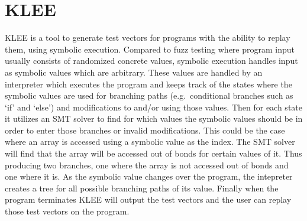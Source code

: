 \section{KLEE}
KLEE\cite{kleepaper} is a tool to generate test vectors for programs with the
ability to replay them, using symbolic execution. Compared to fuzz testing
where program input usually consists of randomized concrete values, symbolic
execution handles input as symbolic values which are arbitrary. These values
are handled by an interpreter which executes the program and keeps track of the
states where the symbolic values are used for branching paths (e.g.\
conditional branches such as `if' and `else') and modifications to and/or using
those values. Then for each state it utilizes an SMT solver to find for which
values the symbolic values should be in order to enter those branches or
invalid modifications. This could be the case where an array is accessed using
a symbolic value as the index. The SMT solver will find that the array will be
accessed out of bonds for certain values of it. Thus producing two branches,
one where the array is not accessed out of bonds and one where it is. As the
symbolic value changes over the program, the intepreter creates a tree for all
possible branching paths of its value. Finally when the program terminates KLEE
will output the test vectors and the user can replay those test vectors on the
program.
